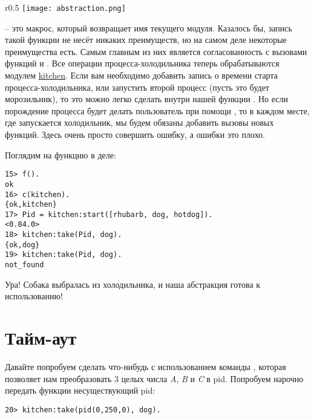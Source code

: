 \begin{wrapfigure}{r}{0.5\linewidth}
    \texttt{[image: abstraction.png]}
\end{wrapfigure}
 \--- это макрос, который возвращает имя текущего модуля.
Казалось бы, запись такой функции не несёт никаких преимуществ, но на самом деле некоторые преимущества есть.
Самым главным из них является согласованность с вызовами функций  и .
Все операции процесса\--холодильника теперь обрабатываются модулем \href{http://learnyousomeerlang.com/static/erlang/kitchen.erl}{kitchen}.
Если вам необходимо добавить запись о времени старта процесса\--холодильника, или запустить второй процесс (пусть это будет морозильник), то это можно легко сделать внутри нашей функции .
Но если порождение процесса будет делать пользователь при помощи , то в каждом месте, где запускается холодильник, мы будем обязаны добавить вызовы новых функций.
Здесь очень просто совершить ошибку, а ошибки это плохо.

Поглядим на функцию в деле:
\begin{lstlisting}[style=erlang]
15> f().
ok
16> c(kitchen).
{ok,kitchen}
17> Pid = kitchen:start([rhubarb, dog, hotdog]).
<0.84.0>
18> kitchen:take(Pid, dog).
{ok,dog}
19> kitchen:take(Pid, dog).
not_found
\end{lstlisting}

Ура!
Собака выбралась из холодильника, и наша абстракция готова к использованию!
\section{Тайм\--аут}
\label{time-out}
Давайте попробуем сделать что\--нибудь с использованием команды , которая позволяет нам преобразовать 3 целых числа \emph{A}, \emph{B} и \emph{C} в pid.
Попробуем нарочно передать функции  несуществующий pid:
\begin{lstlisting}[style=erlang]
20> kitchen:take(pid(0,250,0), dog).
\end{lstlisting}

